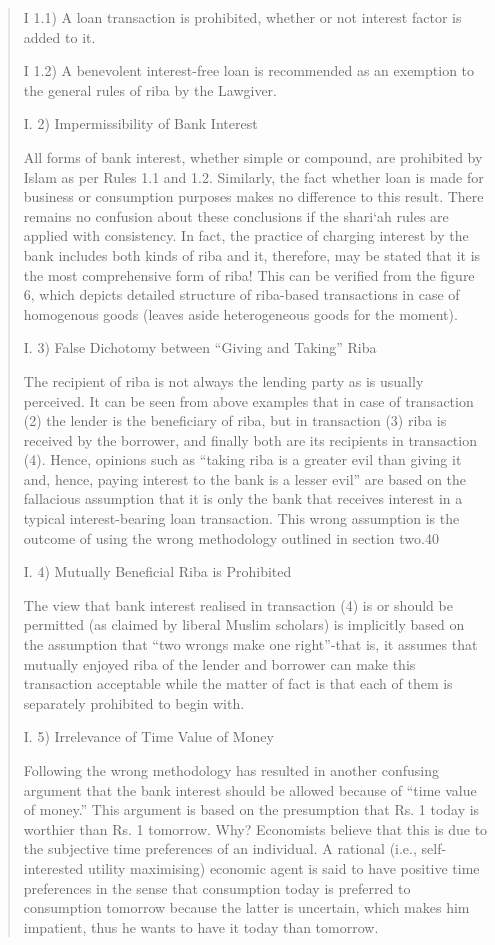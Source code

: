 \begin{quote}
I 1.1) A loan transaction is prohibited, whether or not interest factor is added to it.

I 1.2) A benevolent interest-free loan is recommended as an exemption to the general rules of riba by the Lawgiver.

I. 2) Impermissibility of Bank Interest

All forms of bank interest, whether simple or compound, are prohibited by Islam as per Rules 1.1 and 1.2. Similarly, the fact whether loan is made for business or consumption purposes makes no difference to this result. There remains no confusion about these conclusions if the shari‘ah rules are applied with consistency. In fact, the practice of charging interest by the bank includes both kinds of riba and it, therefore, may be stated that it is the most comprehensive form of riba! This can be verified from the figure 6, which depicts detailed structure of riba-based transactions in case of homogenous goods (leaves aside heterogeneous goods for the moment).

I. 3) False Dichotomy between “Giving and Taking” Riba

The recipient of riba is not always the lending party as is usually perceived. It can be seen from above examples that in case of transaction (2) the lender is the beneficiary of riba, but in transaction (3) riba is received by the borrower, and finally both are its recipients in transaction (4). Hence, opinions such as “taking riba is a greater evil than giving it and, hence, paying interest to the bank is a lesser evil” are based on the fallacious assumption that it is only the bank that receives interest in a typical interest-bearing loan transaction. This wrong assumption is the outcome of using the wrong methodology outlined in section two.40

I. 4) Mutually Beneficial Riba is Prohibited

The view that bank interest realised in transaction (4) is or should be permitted (as claimed by liberal Muslim scholars) is implicitly based on the assumption that “two wrongs make one right”-that is, it assumes that mutually enjoyed riba of the lender and borrower can make this transaction acceptable while the matter of fact is that each of them is separately prohibited to begin with.

I. 5) Irrelevance of Time Value of Money

Following the wrong methodology has resulted in another confusing argument that the bank interest should be allowed because of “time value of money.” This argument is based on the presumption that Rs. 1 today is worthier than Rs. 1 tomorrow. Why? Economists believe that this is due to the subjective time preferences of an individual. A rational (i.e., self-interested utility maximising) economic agent is said to have positive time preferences in the sense that consumption today is preferred to consumption tomorrow because the latter is uncertain, which makes him impatient, thus he wants to have it today than tomorrow.


\end{quote}
